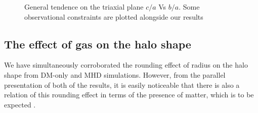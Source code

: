 \begin{figure}[!ht]
  \centering
  \hfill
  \hfill
  \caption{General tendence on the triaxial plane $c/a$ Vs $b/a$. Some observational constraints are plotted alongside our results}
  \label{fig:Triaxiality_Inner_Outer}
\end{figure}


\subsection{The effect of gas on the halo shape}
We have simultaneously corroborated the rounding effect of radius on the halo shape from DM-only and MHD simulations. However, from the parallel presentation of both of the results, it is easily noticeable that there is also a relation of this rounding effect in terms of the presence of matter, which is to be expected \cite{effect of gas}.\\


